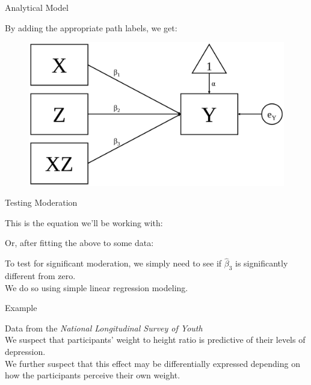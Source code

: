\documentclass{beamer}
\newcommand{\va}[0]{\vspace{12pt}}
\begin{document}
\begin{frame}{Analytical Model}

  By adding the appropriate path labels, we get:

  \begin{figure}
    \includegraphics[width=\textwidth]{figures/modAnalytic2.pdf}
  \end{figure}

\end{frame}

\begin{frame}{Testing Moderation}

  This is the equation we'll be working with:\\
  \begin{center}\end{center}
  \va
  Or, after fitting the above to some data:
  \begin{center}\end{center}
  \va
  To test for significant moderation, we simply need to see if
  $\hat{\beta}_3$ is significantly different from zero.\\
  \va
  We do so using simple linear regression modeling.

\end{frame}



\begin{frame}{Example}

Data from the \emph{National Longitudinal Survey of Youth}\\
\va
We suspect that participants' weight to height ratio is predictive of
their levels of depression.\\
\va
We further suspect that this effect may be differentially expressed
depending on how the participants perceive their own weight.

\end{frame}
\end{document}
